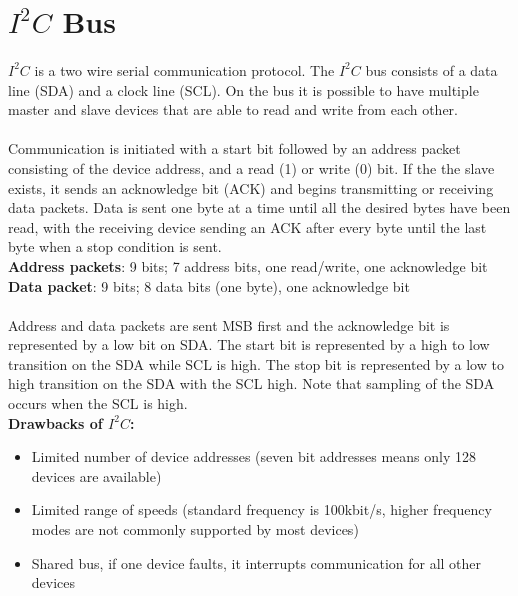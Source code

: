 \section{$I^{2}C$ Bus}
\paragraph{}
$I^{2}C$ is a two wire serial communication protocol.  The $I^{2}C$ bus consists of a data line (SDA) and a clock line (SCL).  On the bus it is possible to have multiple master and slave devices that are able to read and write from each other.
\paragraph{}
Communication is initiated with a start bit followed by an address packet consisting of the device address, and a read (1) or write (0) bit.  If the the slave exists, it sends an acknowledge bit (ACK) and begins transmitting or receiving data packets.  Data is sent one byte at a time until all the desired bytes have been read, with the receiving device sending an ACK after every byte until the last byte when a stop condition is sent.\\
	\textbf{Address packets}: 9 bits; 7 address bits, one read/write, one acknowledge bit
	\textbf{Data packet}: 9 bits; 8 data bits (one byte), one acknowledge bit
\paragraph{}
Address and data packets are sent MSB first and the acknowledge bit is represented by a low bit on SDA.  The start bit is represented by a high to low transition on the SDA while SCL is high.  The stop bit is represented by a low to high transition on the SDA with the SCL high.  Note that sampling of the SDA occurs when the SCL is high.\\

\textbf{Drawbacks of $I^{2}C$:}
\begin{itemize}
\item Limited number of device addresses (seven bit addresses means only 128 devices are available)
\item Limited range of speeds (standard frequency is 100kbit/s, higher frequency modes are not commonly supported by most devices)
\item Shared bus, if one device faults, it interrupts communication for all other devices
\end{itemize}

